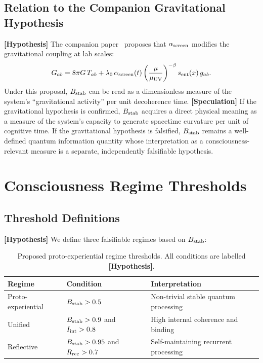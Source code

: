\documentclass[12pt,letterpaper]{article}
\theoremstyle{definition}
\theoremstyle{remark}
\newcommand{\hypothesis}{\textbf{[Hypothesis]}}
\newcommand{\speculation}{\textbf{[Speculation]}}
\newcommand{\ascreen}{\alpha_{\rm screen}}
\newcommand{\Bstab}{B_{\rm stab}}
\begin{document}
\subsection{Relation to the Companion Gravitational Hypothesis}

\hypothesis{} The companion paper~\cite{companion} proposes that $\ascreen$ modifies
the gravitational coupling at lab scales:
\begin{equation}
G_{ab} = 8\pi G\,T_{ab}
  + \lambda_0\,\ascreen(t)\left(\frac{\mu}{\mu_{\rm UV}}\right)^{-\beta}
    s_{\rm ent}(x)\,g_{ab}.
\end{equation}
Under this proposal, $\Bstab$ can be read as a dimensionless measure of the system's
``gravitational activity'' per unit decoherence time.
\speculation{} If the gravitational hypothesis is confirmed, $\Bstab$ acquires a
direct physical meaning as a measure of the system's capacity to generate spacetime
curvature per unit of cognitive time.
If the gravitational hypothesis is falsified, $\Bstab$ remains a well-defined quantum
information quantity whose interpretation as a consciousness-relevant measure is a
separate, independently falsifiable hypothesis.

\section{Consciousness Regime Thresholds}
\label{sec:thresholds}

\subsection{Threshold Definitions}

\hypothesis{} We define three falsifiable regimes based on $\Bstab$:

\begin{table}[htbp]
\centering
\caption{Proposed proto-experiential regime thresholds.
All conditions are labelled \hypothesis{}.}
\label{tab:thresholds}
\renewcommand{\arraystretch}{1.3}
\begin{tabular}{@{}lll@{}}
\toprule
Regime & Condition & Interpretation \\
\midrule
Proto-experiential & $\Bstab > 0.5$ &
  Non-trivial stable quantum processing \\
Unified & $\Bstab > 0.9$ and $I_{\rm int} > 0.8$ &
  High internal coherence and binding \\
Reflective & $\Bstab > 0.95$ and $R_{\rm rec} > 0.7$ &
  Self-maintaining recurrent processing \\
\bottomrule
\end{tabular}
\end{table}
\end{document}
